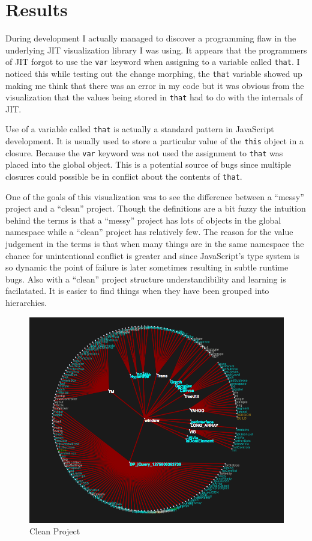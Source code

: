 \documentclass[]{article}
\begin{document}
\section{Results}
\label{sec:results}
During development I actually managed to discover a programming flaw in the underlying JIT visualization library I was using. It appears that the programmers of JIT forgot to use the {\tt var} keyword when assigning to a variable called {\tt that}. I noticed this while testing out the change morphing, the {\tt that} variable showed up making me think that there was an error in my code but it was obvious from the visualization that the values being stored in {\tt that} had to do with the internals of JIT.

Use of a variable called {\tt that} is actually a standard pattern in JavaScript development. It is usually used to store a particular value of the {\tt this} object in a closure. Because the {\tt var} keyword was not used the assignment to {\tt that} was placed into the global object. This is a potential source of bugs since multiple closures could possible be in conflict about the contents of {\tt that}.


One of the goals of this visualization was to see the difference between a ``messy'' project and a ``clean'' project. Though the definitions are a bit fuzzy the intuition behind the terms is that a ``messy'' project has lots of objects in the global namespace while a ``clean'' project has relatively few. The reason for the value judgement in the terms is that when many things are in the same namespace the chance for unintentional conflict is greater and since JavaScript's type system is so dynamic the point of failure is later sometimes resulting in subtle runtime bugs. Also with a ``clean'' project structure understandibility and learning is facilatated. It is easier to find things when they have been grouped into hierarchies.

\begin{figure}[h]
  \begin{center}
    \includegraphics[scale=.25]{clean.png}
  \end{center}
  \caption{Clean Project}
  \label{fig:clean}
\end{figure}
\end{document}
